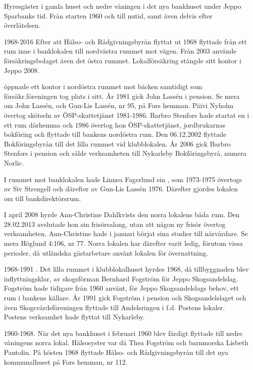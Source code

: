Hyresgäster i gamla huset och nedre våningen i det nya bankhuset under Jeppo Sparbanks tid. Från starten 1960 och till nutid, samt även delvis efter överlåtelsen.


1968-2016
Efter att Hälso- och Rådgivningsbyrån flyttat ut 1968 flyttade  från ett rum inne i banklokalen till nordvästra rummet mot vägen. Från 2003 använde försäkringsbolaget även det östra rummet.	Lokalförsäkring stängde sitt kontor i Jeppo 2008.

 öppnade ett kontor i nordöstra rummet mot bäcken samtidigt som försäkr.föreningen tog plats i sitt. År 1981 gick John Lassén i pension. Se mera om John Lassén, och Gun-Lis Lassén, nr 95, på Fors hemman. Päivi Nyholm övertog skötseln av ÖSP-skattetjänst 1981-1986. Barbro Stenfors hade startat en  i ett rum därhemma och 1986 övertog hon ÖSP-skattetjänst, jordbrukarnas bokföring och flyttade till bankens nordöstra rum. Den 06.12.2002 flyttade Bokföringsbyrån till det lilla rummet vid klubblokalen. År 2006 gick Barbro Stenfors i pension och sålde verksamheten till Nykarleby Bokföringsbyrå, numera Norlic.

I rummet mot banklokalen hade Linnea Fagerlund sin , som 1973-1975 övertogs av Siv Strengell och därefter av Gun-Lis Lassén 1976. Därefter gjordes lokalen om till bankdirektörsrum.

I april 2008 hyrde Ann-Christine Dahlkvists  den norra lokalens båda rum. Den 28.02.2013 avslutade hon sin frisörsalong, utan att någon ny frisör övertog verksamheten. Ann-Christine hade i januari börjat sina studier till närvårdare. Se mera Höglund 4:106, nr 77. Norra lokalen har därefter varit ledig, förutom vissa perioder, då utländska gästarbetare använt lokalen för övernattning.

1968-1991
. Det lilla rummet i klubblokalhuset hyrdes 1968, då tillbyggnaden blev inflyttningsklar, av skogsförman Bernhard Fogström för Jeppo Skogsandelslag. Fogström hade tidigare från 1960 använt, för Jeppo Skogsandelslags behov, ett rum i bankens källare. År 1991 gick Fogström i pension och Skogsandelslaget och även Skogsvårdsföreningen flyttade till Andelsringen i f.d. Postens lokaler. Postens verksamhet hade flyttat till Nykarleby.

1960-1968.
När det nya bankhuset i februari 1960 blev färdigt flyttade  till nedre våningens norra lokal. Hälsosyster var då Thea Fogström och barnmorska Lisbeth Pantolin. På hösten 1968 flyttade Hälso- och Rådgivningsbyrån till det nya	kommunalhuset på Fors hemman, nr 112.


